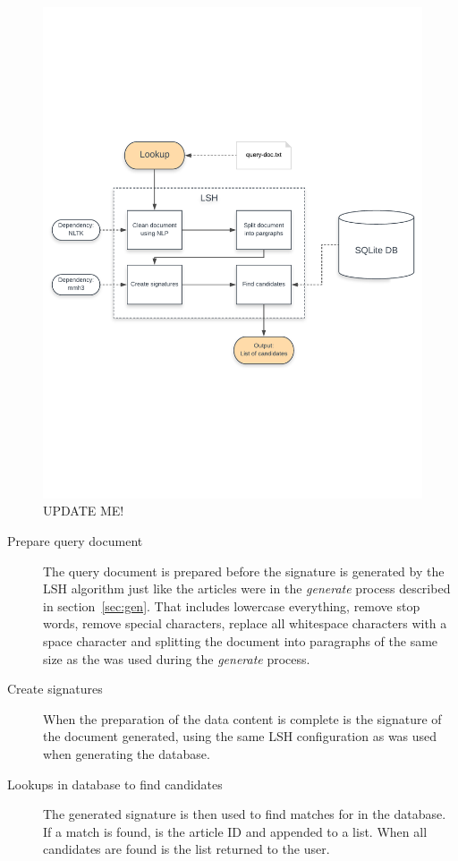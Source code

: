 \begin{figure}[ht]
	\centering
    \includegraphics[width = \linewidth]{docs/report/input/lookup.pdf}
    \captionsetup{width = \linewidth}
    \caption{UPDATE ME!}
    \label{fig:lookup}
\end{figure}

\begin{description}
    \item[Prepare query document] The query document is prepared before the signature is generated by the LSH algorithm just like the articles were in the \emph{generate} process described in section~\ref{sec:gen}. That includes lowercase everything, remove stop words, remove special characters, replace all whitespace characters with a space character and splitting the document into paragraphs of the same size as the was used during the \emph{generate} process.
    \item[Create signatures] When the preparation of the data content is complete is the signature of the document generated, using the same LSH configuration as was used when generating the database.
    \item[Lookups in database to find candidates] The generated signature is then used to find matches for in the database. If a match is found, is the article ID and appended to a list. When all candidates are found is the list returned to the user.
\end{description}